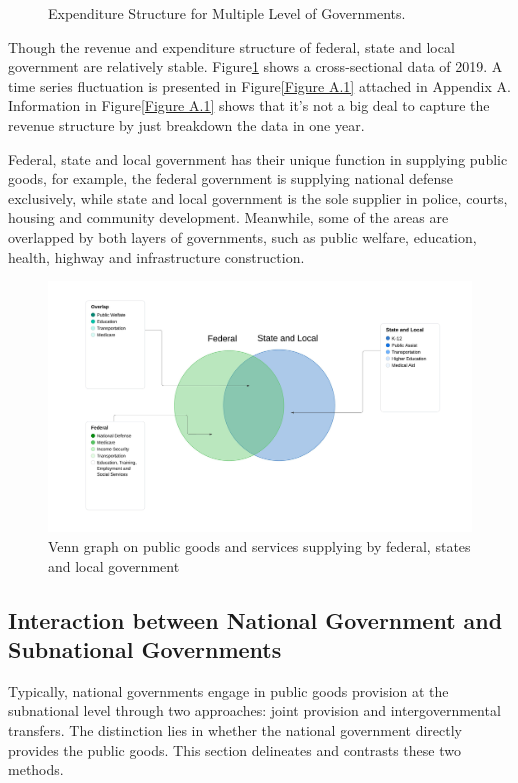 \begin{figure}[H]
  \caption[Expenditure Structure for Multiple Level of Governments in 2019]{Expenditure Structure for Multiple Level of Governments.}    %
  \label{Figure 1.3}
\end{figure}

Though the revenue and expenditure structure of federal, state and local government are relatively stable. Figure\ref*{Figure 1.3} shows a cross-sectional data of 2019. A time series fluctuation is presented in Figure\ref*{Figure A.1} attached in Appendix A. Information in Figure\ref*{Figure A.1} shows that it's not a big deal to capture the revenue structure by just breakdown the data in one year.

Federal, state and local government has their unique function in supplying public goods, for example, the federal government is supplying national defense exclusively, while state and local government is the sole supplier in police, courts, housing and community development. Meanwhile, some of the areas are overlapped by both layers of governments, such as public welfare, education, health, highway and infrastructure construction.

\begin{figure}[H]
  \centering
  \includegraphics[scale=0.4]{Chapter-1/Figures/Venn graph on public goods.jpeg}
  \caption[Venn graph on public goods and services supplying]{Venn graph on public goods and services supplying by federal, states and local government
    \texttt{} }
  \label{Figure 1.4}
\end{figure}

\subsection{Interaction between National Government and Subnational Governments}
Typically, national governments engage in public goods provision at the subnational level through two approaches: joint provision and intergovernmental transfers. The distinction lies in whether the national government directly provides the public goods. This section delineates and contrasts these two methods.

